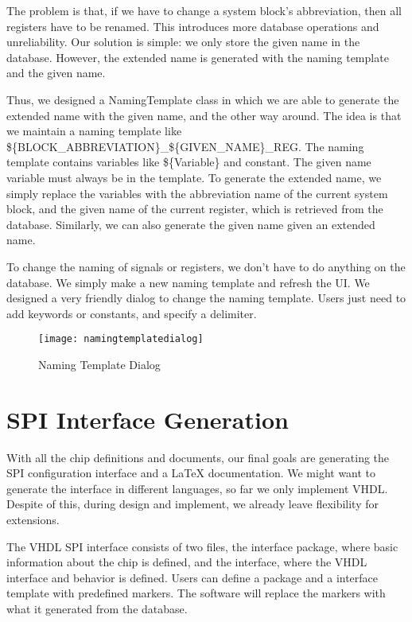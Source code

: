 The problem is that, if we have to change a system block's abbreviation, then all registers have to be renamed. This introduces more database operations and unreliability. Our solution is simple: we only store the given name in the database. However, the extended name is generated with the naming template and the given name. 

Thus, we designed a NamingTemplate class in which we are able to generate the extended name with the given name, and the other way around. The idea is that we maintain a naming template like \$\{BLOCK\_ABBREVIATION\}\_\$\{GIVEN\_NAME\}\_REG. The naming template contains variables like \$\{Variable\} and constant. The given name variable must always be in the template. To generate the extended name, we simply replace the variables with the abbreviation name of the current system block, and the given name of the current register, which is retrieved from the database. Similarly, we can also generate the given name given an extended name.

To change the naming of signals or registers, we don't have to do anything on the database. We simply make a new naming template and refresh the UI. We designed a very friendly dialog to change the naming template. Users just need to add keywords or constants, and specify a delimiter.

\begin{figure}[htbp]
\centering
\texttt{[image: namingtemplatedialog]}
\caption{Naming Template Dialog\label{fig:Naming Template Dialog}}
\end{figure} 

\section{SPI Interface Generation}
With all the chip definitions and documents, our final goals are generating the SPI configuration interface and a LaTeX documentation. We might want to generate the interface in different languages, so far we only implement VHDL. Despite of this, during design and implement, we already leave flexibility for extensions.

The VHDL SPI interface consists of two files, the interface package, where basic information about the chip is defined, and the interface, where the VHDL interface and behavior is defined. Users can define a package and a interface template with predefined markers. The software will replace the markers with what it generated from the database.

